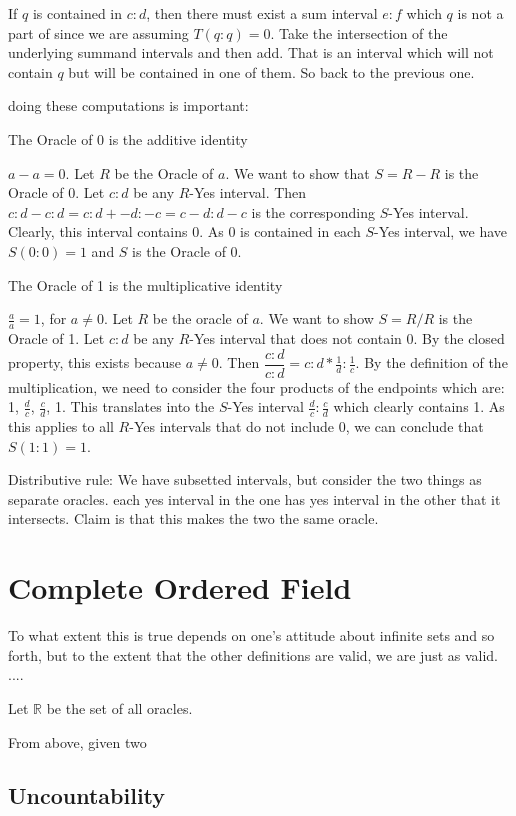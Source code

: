 \documentclass[12pt]{article}
\theoremstyle{remark}
\begin{document}
If $q$ is contained in $c:d$, then there must exist a sum interval $e:f$ which $q$ is not a part of since we are assuming $T(q:q)=0$. Take the intersection of the underlying summand intervals and then add. That is an interval which will not contain $q$ but will be contained in one of them. So back to the previous one. 



doing these computations is important:

The Oracle of 0 is the additive identity

$a-a = 0$. Let $R$ be the Oracle of $a$. We want to show that $S= R-R$ is the Oracle of 0. Let $c:d$ be any $R$-Yes interval. Then $c:d-c:d = c:d+ -d:-c = c-d:d-c$ is the corresponding $S$-Yes interval. Clearly, this interval contains 0. As 0 is contained in each $S$-Yes interval, we have $S(0:0)=1$ and $S$ is the Oracle of 0. 

The Oracle of 1 is the multiplicative identity

$\tfrac{a}{a} = 1$, for $a \neq 0$. Let $R$ be the oracle of $a$. We want to show $S=R/R$ is the Oracle of 1. Let $c:d$ be any $R$-Yes interval that does not contain 0. By the closed property, this exists because $a \neq 0$. Then $\dfrac{c:d}{c:d} = c:d * \tfrac{1}{d}:\tfrac{1}{c}$. By the definition of the multiplication, we need to consider the four products of the endpoints which are: 1, $\tfrac{d}{c}$, $\tfrac{c}{d}$, 1. This translates into the $S$-Yes interval $\tfrac{d}{c}:\tfrac{c}{d}$ which clearly contains 1. As this applies to all $R$-Yes intervals that do not include 0, we can conclude that $S(1:1) =1$.



Distributive rule:  We have subsetted intervals, but consider the two things as separate oracles. each yes interval in the one has yes interval in the other that it intersects. Claim is that this makes the two the same oracle. 


\section{Complete Ordered Field}

To what extent this is true depends on one's attitude about infinite sets and so forth, but to the extent that the other definitions are valid, we are just as valid. ....

Let $\mathbb{R}$ be the set of all oracles. 

From above, given two 


\subsection{Uncountability}
\end{document}
